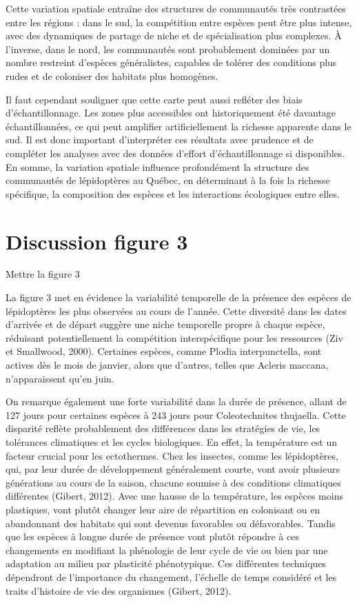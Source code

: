 \documentclass[9pt,twocolumn,twoside,]{pnas-new}
\begin{document}
Cette variation spatiale entraîne des structures de communautés très
contrastées entre les régions : dans le sud, la compétition entre
espèces peut être plus intense, avec des dynamiques de partage de niche
et de spécialisation plus complexes. À l'inverse, dans le nord, les
communautés sont probablement dominées par un nombre restreint d'espèces
généralistes, capables de tolérer des conditions plus rudes et de
coloniser des habitats plus homogènes.

Il faut cependant souligner que cette carte peut aussi refléter des
biais d'échantillonnage. Les zones plus accessibles ont historiquement
été davantage échantillonnées, ce qui peut amplifier artificiellement la
richesse apparente dans le sud. Il est donc important d'interpréter ces
résultats avec prudence et de compléter les analyses avec des données
d'effort d'échantillonnage si disponibles. En somme, la variation
spatiale influence profondément la structure des communautés de
lépidoptères au Québec, en déterminant à la fois la richesse spécifique,
la composition des espèces et les interactions écologiques entre elles.

\section*{Discussion figure 3}\label{discussion-figure-3}

Mettre la figure 3

La figure 3 met en évidence la variabilité temporelle de la présence des
espèces de lépidoptères les plus observées au cours de l'année. Cette
diversité dans les dates d'arrivée et de départ suggère une niche
temporelle propre à chaque espèce, réduisant potentiellement la
compétition interspécifique pour les ressources (Ziv et Smallwood,
2000). Certaines espèces, comme Plodia interpunctella, sont actives dès
le mois de janvier, alors que d'autres, telles que Acleris maccana,
n'apparaissent qu'en juin.

On remarque également une forte variabilité dans la durée de présence,
allant de 127 jours pour certaines espèces à 243 jours pour
Coleotechnites thujaella. Cette disparité reflète probablement des
différences dans les stratégies de vie, les tolérances climatiques et
les cycles biologiques. En effet, la température est un facteur crucial
pour les ectothermes. Chez les insectes, comme les lépidoptères, qui,
par leur durée de développement généralement courte, vont avoir
plusieurs générations au cours de la saison, chacune soumise à des
conditions climatiques différentes (Gibert, 2012). Avec une hausse de la
température, les espèces moins plastiques, vont plutôt changer leur aire
de répartition en colonisant ou en abandonnant des habitats qui sont
devenus favorables ou défavorables. Tandis que les espèces à longue
durée de présence vont plutôt répondre à ces changements en modifiant la
phénologie de leur cycle de vie ou bien par une adaptation au milieu par
plasticité phénotypique. Ces différentes techniques dépendront de
l'importance du changement, l'échelle de temps considéré et les traits
d'histoire de vie des organismes (Gibert, 2012).
\end{document}
